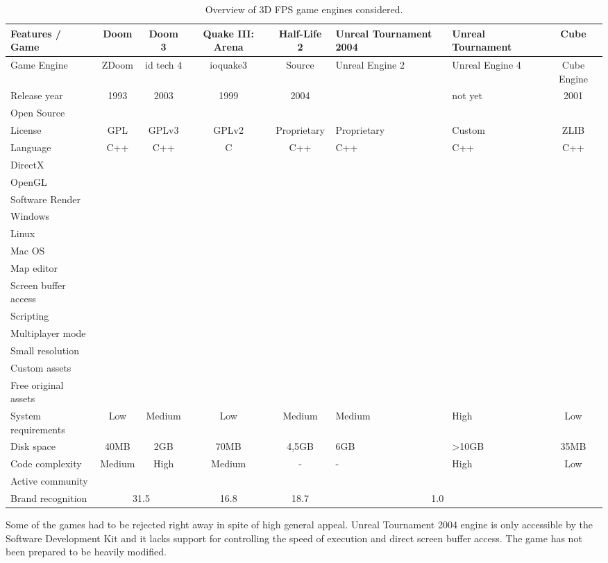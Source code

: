 \documentclass[english,american,conference, balance]{IEEEtran}
\providecommand{\tabularnewline}{\\}
\newcommand*\OK{\ding{51}}
\begin{document}
\begin{table*}
\caption{\label{tab:engines}Overview of 3D FPS game engines considered.}

\centering{}\begin{tabular}{lcccc>{\centering}p{1.5cm}>{\centering}p{1.5cm}c}
\toprule 
Features / Game & Doom & Doom 3  & Quake III: Arena  & Half-Life 2  & Unreal Tournament 2004   & Unreal Tournament   & Cube\tabularnewline
\midrule
Game Engine  & ZDoom\cite{zdoom-wiki} & id tech 4  & ioquake3  & Source  & Unreal Engine 2  & Unreal Engine 4  & Cube Engine \tabularnewline
Release year  & 1993  & 2003  & 1999  & 2004  & 2004  & not yet  & 2001 \tabularnewline
Open Source  & \OK  & \OK  & \OK  &  &  & \OK  & \OK \tabularnewline
License  & GPL  & GPLv3  & GPLv2  & Proprietary  & Proprietary & Custom  & ZLIB \tabularnewline
Language  & C++  & C++  & C  & C++  & C++  & C++  & C++ \tabularnewline
\midrule 
DirectX  &  & \OK  &  & \OK  &  & \OK  & \tabularnewline
OpenGL  & \OK\footnotemark  & \OK  & \OK  & \OK  & \OK  & \OK  & \OK \tabularnewline
Software Render  & \OK  &  &  &  &  &  & \tabularnewline
\midrule
Windows  & \OK  & \OK  & \OK  & \OK  & \OK  & \OK  & \OK \tabularnewline
Linux  & \OK  & \OK  & \OK  & \OK  & \OK  & \OK  & \OK \tabularnewline
Mac OS  & \OK  & \OK  & \OK  & \OK  & \OK  & \OK  & \tabularnewline
\midrule
Map editor  & \OK  & \OK  & \OK  & \OK  & \OK  & \OK  & \OK \tabularnewline
Screen buffer access  & \OK  & \OK  & \OK  &  &  & \OK  & \OK \tabularnewline
Scripting  & \OK  & \OK  &  & \OK  & \OK  & \OK  & \OK \tabularnewline
Multiplayer mode & \OK  & \OK  & \OK  &  & \OK  & \OK  & \OK \tabularnewline
Small resolution & \OK  & \OK  & \OK  & \OK  & \OK  & \OK  & \OK \tabularnewline
\midrule
Custom assets  & \OK  & \OK  & \OK & \OK  & \OK  & \OK  & \OK \tabularnewline
Free original assets  &  &  &  &  &  & \OK  & \OK \tabularnewline
\midrule
System requirements  & Low  & Medium  & Low  & Medium  & Medium  & High  & Low\tabularnewline
Disk space & 40MB  & 2GB  & 70MB  & 4,5GB  & 6GB  & \textgreater{}10GB  & 35MB \tabularnewline
Code complexity  & Medium & High  & Medium  & - & -  & High  & Low \tabularnewline
\midrule 
Active community  & \OK  & \OK  & \OK  & \OK  &  & \OK  & \tabularnewline
\midrule
Brand recognition & \multicolumn{2}{c}{31.5} & 16.8 & 18.7 & \multicolumn{2}{c}{1.0} & 0.1\tabularnewline
\bottomrule
\end{tabular}
\end{table*}

Some of the games had to be rejected right away in spite of high general
appeal. Unreal Tournament 2004 engine is only accessible by the Software
Development Kit and it lacks support for controlling the speed of
execution and direct screen buffer access. The game has not been prepared
to be heavily modified.
\end{document}
